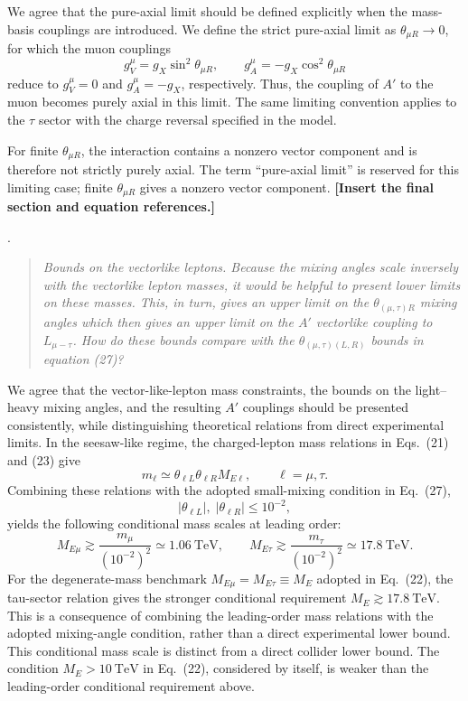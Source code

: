 \documentclass[12pt,a4paper]{article}
\begin{document}

We agree that the pure-axial limit should be defined explicitly when the mass-basis couplings are introduced. We define the strict pure-axial limit as \(\theta_{\mu R}\to0\), for which the muon couplings
\[
g_V^\mu=g_X\sin^2\theta_{\mu R},
\qquad
g_A^\mu=-g_X\cos^2\theta_{\mu R}
\]
reduce to \(g_V^\mu=0\) and \(g_A^\mu=-g_X\), respectively. Thus, the coupling of \(A'\) to the muon becomes purely axial in this limit. The same limiting convention applies to the \(\tau\) sector with the charge reversal specified in the model.

For finite \(\theta_{\mu R}\), the interaction contains a nonzero vector component and is therefore not strictly purely axial. The term ``pure-axial limit'' is reserved for this limiting case; finite \(\theta_{\mu R}\) gives a nonzero vector component. \textbf{[Insert the final section and equation references.]}

\medskip
{}.
\begin{quote}\itshape
Bounds on the vectorlike leptons. Because the mixing angles scale inversely with the vectorlike lepton masses, it would be helpful to present lower limits on these masses. This, in turn, gives an upper limit on the \(\theta_{(\mu,\tau)R}\) mixing angles which then gives an upper limit on the \(A'\) vectorlike coupling to \(L_{\mu-\tau}\). How do these bounds compare with the \(\theta_{(\mu,\tau)(L,R)}\) bounds in equation (27)?
\end{quote}


We agree that the vector-like-lepton mass constraints, the bounds on the light--heavy mixing angles, and the resulting \(A'\) couplings should be presented consistently, while distinguishing theoretical relations from direct experimental limits. In the seesaw-like regime, the charged-lepton mass relations in Eqs.~(21) and (23) give
\[
m_\ell\simeq\theta_{\ell L}\theta_{\ell R}M_{E\ell},
\qquad \ell=\mu,\tau.
\]
Combining these relations with the adopted small-mixing condition in Eq.~(27),
\[
|\theta_{\ell L}|,\;|\theta_{\ell R}|\leq10^{-2},
\]
yields the following conditional mass scales at leading order:
\[
M_{E\mu}\gtrsim
\frac{m_\mu}{(10^{-2})^2}
\simeq1.06~\mathrm{TeV},
\qquad
M_{E\tau}\gtrsim
\frac{m_\tau}{(10^{-2})^2}
\simeq17.8~\mathrm{TeV}.
\]
For the degenerate-mass benchmark \(M_{E\mu}=M_{E\tau}\equiv M_E\) adopted in Eq.~(22), the tau-sector relation gives the stronger conditional requirement \(M_E\gtrsim17.8~\mathrm{TeV}\). This is a consequence of combining the leading-order mass relations with the adopted mixing-angle condition, rather than a direct experimental lower bound. This conditional mass scale is distinct from a direct collider lower bound. The condition \(M_E>10~\mathrm{TeV}\) in Eq.~(22), considered by itself, is weaker than the leading-order conditional requirement above.
\end{document}
